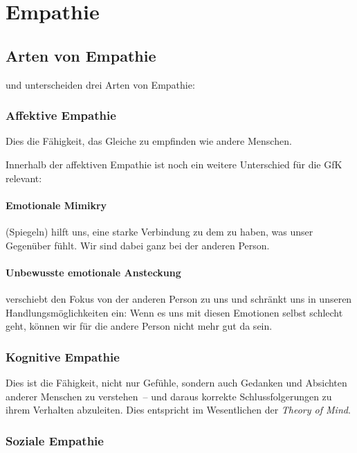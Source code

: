 \section{Empathie}
\label{empathie}

\subsection{Arten von Empathie}

\cite{shaw-empathie} und \cite[S.~100~f]{gfk-dummies} unterscheiden drei Arten von Empathie:


\subsubsection{Affektive Empathie}

Dies die Fähigkeit, das Gleiche zu empfinden wie andere Menschen.

Innerhalb der affektiven Empathie ist noch ein weitere Unterschied für die GfK relevant:

\paragraph{Emotionale Mimikry} (Spiegeln) hilft uns, eine starke Verbindung zu dem zu haben, was unser Gegenüber fühlt. Wir sind dabei ganz bei der anderen Person.

\paragraph{Unbewusste emotionale Ansteckung} verschiebt den Fokus von der anderen Person zu uns und schränkt uns in unseren Handlungsmöglichkeiten ein: Wenn es uns mit diesen Emotionen selbst schlecht geht, können wir für die andere Person nicht mehr gut da sein.


\subsubsection{Kognitive Empathie}

Dies ist die Fähigkeit, nicht nur Gefühle, sondern auch Gedanken und Absichten anderer Menschen zu verstehen~-- und daraus korrekte Schlussfolgerungen zu ihrem Verhalten abzuleiten. Dies entspricht im Wesentlichen der \emph{Theory of Mind}.\cite{theory-of-mind-schrepfer}


\subsubsection{Soziale Empathie}

